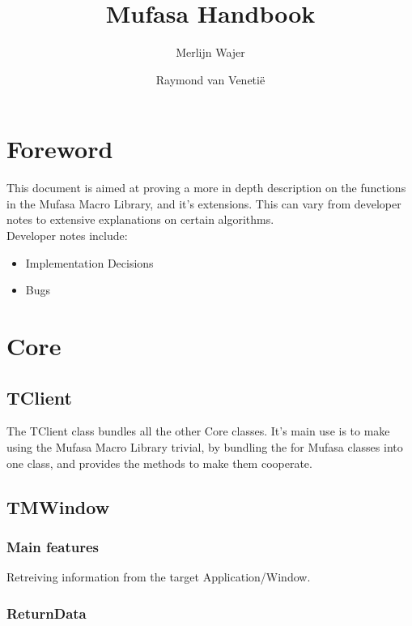 \documentclass[a4paper]{report}
\begin{document}
\title{Mufasa Handbook}
\author{Merlijn Wajer \and Raymond van Veneti\"{e}}

\maketitle
\tableofcontents

\chapter{Foreword}

This document is aimed at proving a more in depth description on the
functions in the Mufasa Macro Library, and it's extensions.
This can vary from developer notes to extensive explanations on certain
algorithms. \\
Developer notes include:
\begin{itemize}
	\item Implementation Decisions
	\item Bugs
\end{itemize}


\chapter{Core}

\section{TClient}

The TClient class bundles all the other Core classes.
It's main use is to make using the Mufasa Macro Library trivial, by bundling
the for Mufasa classes into one class, and provides the methods to make them 
cooperate.

\section{TMWindow}

\subsection{Main features}

Retreiving information from the target Application/Window.

\subsection{ReturnData}
\end{document}
